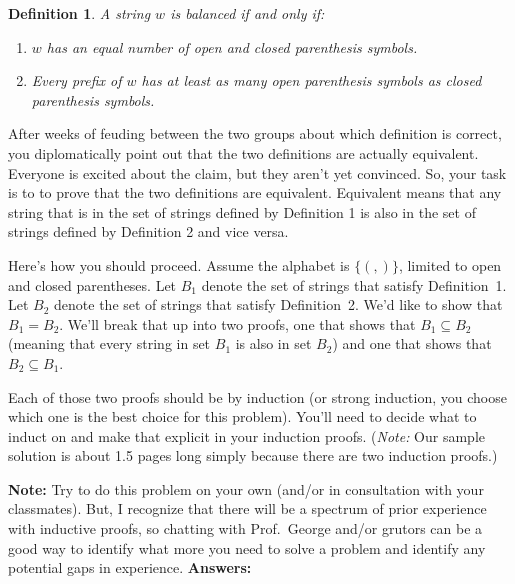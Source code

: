 \documentclass[11pt]{article}
\newtheorem{definition}{Definition}
\begin{document}
\begin{definition}
A string $w$ is balanced if and only if:
	\begin{enumerate}
		\item $w$ has an equal number of open and closed parenthesis symbols.
		\item Every prefix of $w$ has at least as many open parenthesis symbols as closed parenthesis symbols.
	\end{enumerate}
\end{definition}

After weeks of feuding between the two groups about which definition is correct, you diplomatically point out that the two definitions are actually equivalent.  
Everyone is excited about the claim, but they aren't yet convinced.
So, your task is to to prove that the two definitions are equivalent.  Equivalent means that any string that is in the set of strings defined by Definition 1 is also in the set of strings defined by Definition 2 and vice versa.  

Here's how you should proceed. Assume the alphabet is $\{(,)\}$, limited to open and closed parentheses. Let $B_1$ denote the set of strings that satisfy Definition~1.  Let $B_2$ denote the set of strings that satisfy Definition~2.  We'd like to show that $B_1 = B_2$.  We'll break that up into two proofs, one that shows that $B_1 \subseteq B_2$ (meaning that every string in set $B_1$ is also in set $B_2$) and one that shows that $B_2 \subseteq B_1$.

Each of those two proofs should be by induction (or strong induction, you choose which one is the best choice for this problem).
You'll need to decide what to induct on and make that explicit in your induction proofs.  (\emph{Note:}  Our sample solution is about 1.5 pages long simply because there are two induction proofs.)

\textbf{Note:}  Try to do this problem on your own (and/or in consultation with your classmates).  But, I recognize that there will be a spectrum of prior experience with inductive proofs, so chatting with Prof.\ George and/or grutors can be a good way to identify what more you need to solve a problem and identify any potential gaps in experience.
\newpage
\textbf{Answers:}
\end{document}
